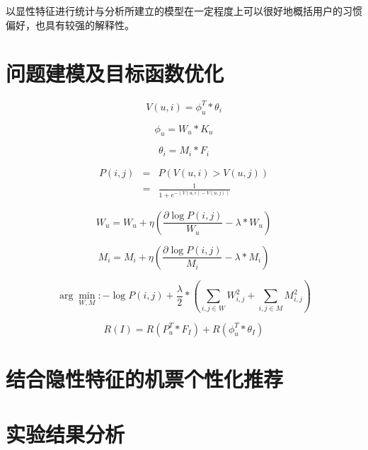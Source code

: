 以显性特征进行统计与分析所建立的模型在一定程度上可以很好地概括用户的习惯偏好，也具有较强的解释性。



\section{问题建模及目标函数优化}

\begin{equation}
	V(u,i) = \phi_u^T * \theta_i
\end{equation}

\begin{equation}
	\phi_u = W_u * K_u
\end{equation}

\begin{equation}
	\theta_i = M_i * F_i
\end{equation}




\begin{eqnarray}
    P(i,j) & = & P(V(u,i) > V(u,j)) \nonumber \\
	 & = &\frac{1}{1+e^{-(V(u,i) - V(u,j))}}
\end{eqnarray}

\begin{equation}
	W_u = W_u + \eta(\frac{\partial \log P(i,j)}{W_u} - \lambda*W_u)
\end{equation}

\begin{equation}
	M_i = M_i + \eta(\frac{\partial \log P(i,j)}{M_i} - \lambda*M_i)
\end{equation}

\begin{equation}
  \arg\min_{W,M} : - \log P(i,j) + \frac{\lambda}{2} * (\sum_{i,j \in W}W_{i,j}^2 + \sum_{i,j \in M}M_{i,j}^2)
\end{equation}

\begin{equation}
	R(I) =  R(P_u^T * F_I) + R(\phi_u^T * \theta_I)
\end{equation}

\section{结合隐性特征的机票个性化推荐}

\section{实验结果分析}